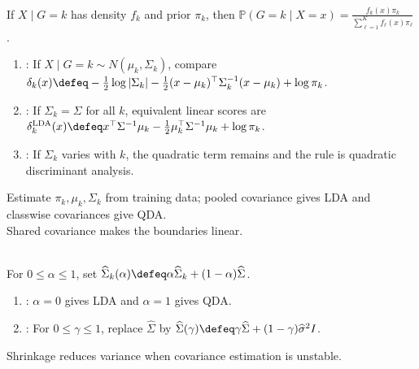 \begin{method} \label{meth:sl-gaussian-discriminant-analysis} \\
If $X\mid G=k$ has density $f_k$ and prior $\pi_k$, then $\mathbb{P}(G=k\mid X=x)=\frac{f_k(x)\pi_k}{\sum\limits_{\ell=1}^{K}f_\ell(x)\pi_\ell}$.
\begin{enumerate}[label=(\roman*)]
\setlength{\itemsep}{0pt}
\item {}: If $X\mid G=k\sim N(\mu_k,\Sigma_k)$, compare $\delta_k(x)\defeq-\frac{1}{2}\log|\Sigma_k|-\frac{1}{2}(x-\mu_k)^\top\Sigma_k^{-1}(x-\mu_k)+\log\pi_k$.
\item {}: If $\Sigma_k=\Sigma$ for all $k$, equivalent linear scores are $\delta_k^{\mathrm{LDA}}(x)\defeq x^\top\Sigma^{-1}\mu_k-\frac{1}{2}\mu_k^\top\Sigma^{-1}\mu_k+\log\pi_k$.
\item {}: If $\Sigma_k$ varies with $k$, the quadratic term remains and the rule is quadratic discriminant analysis.
\end{enumerate}
Estimate $\pi_k,\mu_k,\Sigma_k$ from training data; pooled covariance gives LDA and classwise covariances give QDA.\\
Shared covariance makes the boundaries linear.
\end{method}

\begin{method} \label{meth:sl-regularized-discriminant-analysis} \\
For $0\leq\alpha\leq1$, set $\widehat{\Sigma}_k(\alpha)\defeq\alpha\widehat{\Sigma}_k+(1-\alpha)\widehat{\Sigma}$.
\begin{enumerate}[label=(\roman*)]
\setlength{\itemsep}{0pt}
\item {}: $\alpha=0$ gives LDA and $\alpha=1$ gives QDA.
\item {}: For $0\leq\gamma\leq1$, replace $\widehat{\Sigma}$ by $\widehat{\Sigma}(\gamma)\defeq\gamma\widehat{\Sigma}+(1-\gamma)\widehat{\sigma}^{2}I$.
\end{enumerate}
Shrinkage reduces variance when covariance estimation is unstable.
\end{method}

